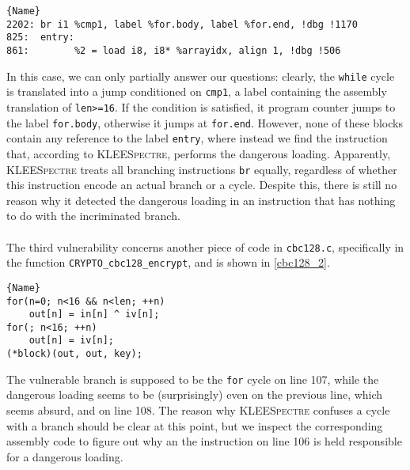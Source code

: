 \documentclass[target=mst,aauheader=aics]{thud}
\theoremstyle{definition}
\begin{document}
	\lstset{
		numbers=none
	}
	\begin{minipage}{.9\textwidth}
	\begin{lstlisting}[caption=\texttt{assembly.ll} (for AES-CBC), label=asm2]{Name}
2202: br i1 %cmp1, label %for.body, label %for.end, !dbg !1170
825:  entry:  
861:  		%2 = load i8, i8* %arrayidx, align 1, !dbg !506

	\end{lstlisting}
	\end{minipage}
	\vspace{3mm}

	In this case, we can only partially answer our questions: clearly, the \texttt{while} cycle is translated into a jump conditioned on \texttt{cmp1}, a label containing the assembly translation of \texttt{len>=16}. If the condition is satisfied, it program counter jumps to the label \texttt{for.body}, otherwise it jumps at \texttt{for.end}. However, none of these blocks contain any reference to the label \texttt{entry}, where instead we find the instruction that, according to \textsc{KLEESpectre}, performs the dangerous loading. Apparently, \textsc{KLEESpectre} treats all branching instructions \texttt{br} equally, regardless of whether this instruction encode an actual branch or a cycle. Despite this, there is still no reason why it detected the dangerous loading in an instruction that has nothing to do with the incriminated branch. 
	\paragraph{}The third vulnerability concerns another piece of code in \texttt{cbc128.c}, specifically in the function \texttt{CRYPTO\_cbc128\_encrypt}, and is shown in \ref{cbc128_2}.
	
	\begin{minipage}{.45\textwidth}
		\begin{lstlisting}[caption=\texttt{cbc128.c}, firstnumber=105, label=cbc128_2]{Name}
for(n=0; n<16 && n<len; ++n)
	out[n] = in[n] ^ iv[n];
for(; n<16; ++n)
	out[n] = iv[n];
(*block)(out, out, key);
		\end{lstlisting}
	\end{minipage}
	\vspace{3mm}
	
	The vulnerable branch is supposed to be the \texttt{for} cycle on line 107, while the dangerous loading seems to be (surprisingly) even on the previous line, which seems absurd, and on line 108. The reason why \textsc{KLEESpectre} confuses a cycle with a branch should be clear at this point, but we inspect the corresponding assembly code to figure out why an the instruction on line 106 is held responsible for a dangerous loading.
	
\end{document}
